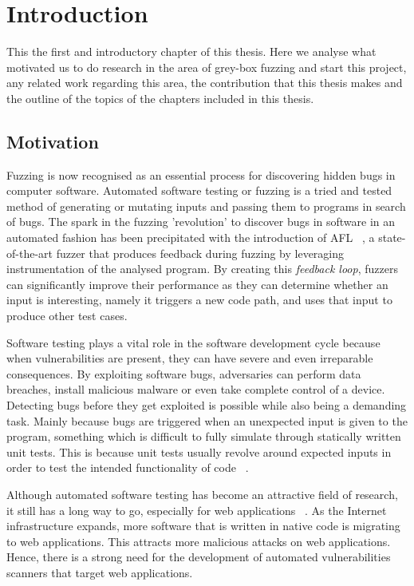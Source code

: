 \chapter{Introduction}
\minitoc
\vspace*{1cm}

This the first and introductory chapter of this thesis. Here we analyse what motivated us to do research in the area of grey-box fuzzing and start this project, any related work regarding this area, the contribution that this thesis makes and the outline of the topics of the chapters included in this thesis.

\section{Motivation}
Fuzzing is now recognised as an essential process for discovering hidden bugs in computer software. Automated software testing or fuzzing is a tried and tested method of generating or mutating inputs and passing them to programs in search of bugs. The spark in the fuzzing 'revolution' to discover bugs in software in an automated fashion has been precipitated with the introduction of AFL ~\cite{zalewski2015american}, a state-of-the-art fuzzer that produces feedback during fuzzing by leveraging instrumentation of the analysed program. By creating this \textit{feedback loop}, fuzzers can significantly improve their performance as they can determine whether an input is interesting, namely it triggers a new code path, and uses that input to produce other test cases.

Software testing plays a vital role in the software development cycle because when vulnerabilities are present, they can have severe and even irreparable consequences. By exploiting software bugs, adversaries can perform data breaches, install malicious malware or even take complete control of a device. Detecting bugs before they get exploited is possible while also being a demanding task. Mainly because bugs are triggered when an unexpected input is given to the program, something which is difficult to fully simulate through statically written unit tests. This is because unit tests usually revolve around expected inputs in order to test the intended functionality of code ~\cite{aschermann2019nautilus}.

Although automated software testing has become an attractive field of research, it still has a long way to go, especially for web applications ~\cite{doupe2010johnny}. As the Internet infrastructure expands, more software that is written in native code is migrating to web applications. This attracts more malicious attacks on web applications. Hence, there is a strong need for the development of automated vulnerabilities scanners that target web applications.
 

